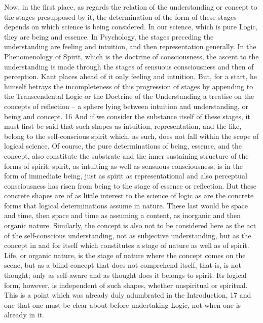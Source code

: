 Now, in the first place, as regards the relation of the understanding or concept
to the stages presupposed by it, the determination of the form of these stages
depends on which science is being considered. In our science, which is pure
Logic, they are being and essence. In Psychology, the stages preceding the
understanding are feeling and intuition, and then representation generally.
In the Phenomenology of Spirit, which is the doctrine of consciousness,
the ascent to the understanding is made through the stages of sensuous
consciousness and then of perception. Kant places ahead of it only feeling
and intuition. But, for a start, he himself betrays the incompleteness of
this progression of stages by appending to the Transcendental Logic or the
Doctrine of the Understanding a treatise on the concepts of reflection – a
sphere lying between intuition and understanding, or being and concept. 16
And if we consider the substance itself of these stages, it must first be
said that such shapes as intuition, representation, and the like, belong to
the self-conscious spirit which, as such, does not fall within the scope of
logical science. Of course, the pure determinations of being, essence, and
the concept, also constitute the substrate and the inner sustaining structure
of the forms of spirit; spirit, as intuiting as well as sensuous consciousness, is
in the form of immediate being, just as spirit as representational and also
perceptual consciousness has risen from being to the stage of essence or
reflection. But these concrete shapes are of as little interest to the science
of logic as are the concrete forms that logical determinations assume in
nature. These last would be space and time, then space and time as assuming
a content, as inorganic and then organic nature. Similarly, the concept is also
not to be considered here as the act of the self-conscious understanding,
not as subjective understanding, but as the concept in and for itself which
constitutes a stage of nature as well as of spirit. Life, or organic nature, is
the stage of nature where the concept comes on the scene, but as a blind
concept that does not comprehend itself, that is, is not thought; only as
self-aware and as thought does it belongs to spirit. Its logical form, however,
is independent of such shapes, whether unspiritual or spiritual. This is a
point which was already duly adumbrated in the Introduction, 17 and one
that one must be clear about before undertaking Logic, not when one is
already in it.

